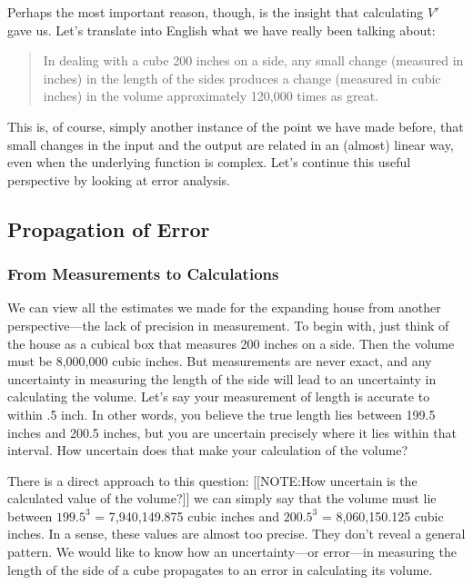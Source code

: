 Perhaps the most important reason, though, is the insight that
calculating $V'$ gave us.  Let's translate into English what we have
really been talking about:
\begin{quotation}

In dealing with a cube 200 inches on a side, any small change
(measured in inches) in the length of the sides produces a change
(measured in cubic inches) in the volume approximately 120,000 times
as great.
\end{quotation}
This is, of course, simply another instance of the point we have made
before, that small changes in the input and the output are related in
an (almost) linear way, even when the underlying function is complex.
Let's continue this useful perspective by looking at error analysis.

\subsection{Propagation of Error}
\label{subsec:propagation-of-error}

\subsubsection{From Measurements to Calculations}
\label{subsubsec:from-measurements-to-calculations}

We can view all the estimates we made for the expanding house from
another perspective---the lack of precision in measurement.  To begin
with, just think of the house as a cubical box that measures 200
inches on a side.  Then the volume must be 8,000,000 cubic inches.
But measurements are never exact, and any
uncertainty in measuring the length of the side
will lead to an uncertainty in calculating the volume.  Let's say your
measurement of length is accurate to within .5 inch.  In other words,
you believe the true length lies between 199.5 inches and 200.5
inches, but you are uncertain precisely where it lies within that
interval.  How uncertain does that make your calculation of the
volume?

There is a direct approach to this question: 
[[NOTE:How uncertain is  the calculated value  of the volume?]]
we can simply say that the volume must lie between $199.5^3$ =
7,940,149.875 cubic inches and $200.5^3$ = 8,060,150.125 cubic inches.
In a sense, these values are almost too precise.  They don't reveal a
general pattern.  We would like to know how an uncertainty---or
error---in measuring the length of the side of a cube propagates to an
error in calculating its volume.

